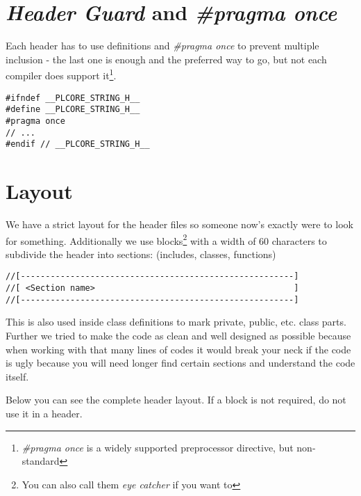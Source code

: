 \section{\emph{Header Guard} and \emph{\#pragma once}}
Each header has to use definitions and \emph{\#pragma once} to prevent multiple inclusion - the last one is enough and the preferred way to go, but not each compiler does support it\footnote{\emph{\#pragma once} is a widely supported preprocessor directive, but non-standard}.

\begin{lstlisting}[caption=Header guard]
#ifndef __PLCORE_STRING_H__
#define __PLCORE_STRING_H__
#pragma once
// ...
#endif // __PLCORE_STRING_H__
\end{lstlisting}




\section{Layout}
We have a strict layout for the header files so someone now's exactly were to look for something. Additionally we use blocks\footnote{You can also call them \emph{eye catcher} if you want to} with a width of 60 characters to subdivide the header into sections: (includes, classes, functions)

\begin{lstlisting}[caption=Code section comment blocks]
//[-------------------------------------------------------]
//[ <Section name>                                        ]
//[-------------------------------------------------------]
\end{lstlisting}

This is also used inside class definitions to mark private, public, etc. class parts. Further we tried to make the code as clean and well designed as possible because when working with that many lines of codes it would break your neck if the code is ugly because you will need longer find certain sections and understand the code itself.

Below you can see the complete header layout. If a block is not required, do not use it in a header.


